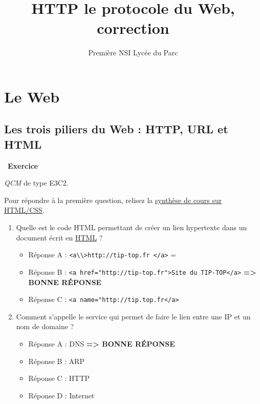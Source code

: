\documentclass[
  11pt,
]{article}
\title{HTTP le protocole du Web, correction}
\author{Première NSI Lycée du Parc}
\date{}
\newcommand{\passthrough}[1]{#1}
\providecommand{\tightlist}{%
  \setlength{\itemsep}{0pt}\setlength{\parskip}{0pt}}
\newcounter{exo}
\newenvironment{exercice}[1]
{\par \medskip   \addtocounter{exo}{1} \noindent  
\begin{bclogo}[arrondi =0.1,   noborder = true, logo=\bccrayon, marge=4]{~\textbf{Exercice} \textbf{\theexo} {\itshape #1} }  \par}
{
\end{bclogo}
 \par \bigskip }
\newcounter{def}
\newcounter{cours}
\begin{document}
\maketitle

\renewcommand*\contentsname{Table des matières}
{
\hypersetup{linkcolor=}
\setcounter{tocdepth}{3}
\tableofcontents
}
\hypertarget{le-web}{%
\section{Le Web}\label{le-web}}

\hypertarget{les-trois-piliers-du-web-http-url-et-html}{%
\subsection{Les trois piliers du Web : HTTP, URL et
HTML}\label{les-trois-piliers-du-web-http-url-et-html}}

\begin{exercice}{}

\emph{QCM} de type E3C2.

Pour répondre à la première question, relisez la
\href{https://parc-nsi.github.io/premiere-nsi/chapitre2/memo/MemoHTML-CSS-2020.pdf}{synthèse
de cours sur HTML/CSS}.

\begin{enumerate}
\def\labelenumi{\arabic{enumi}.}
\tightlist
\item
  Quelle est le code HTML permettant de créer un lien hypertexte dans un
  document écrit en
  \href{https://developer.mozilla.org/fr/docs/Glossaire/HTML}{HTML} ?

  \begin{itemize}
  \tightlist
  \item
    Réponse A : \passthrough{\lstinline!<a\\>http://tip-top.fr </a>!} =
  \item
    Réponse B :
    \passthrough{\lstinline!<a href="http://tip-top.fr">Site du TIP-TOP</a>!}
    \textbf{=\textgreater{} BONNE RÉPONSE}
  \item
    Réponse C : \passthrough{\lstinline!<a name="http://tip.top.fr</a>!}
  \end{itemize}
\item
  Comment s'appelle le service qui permet de faire le lien entre une IP
  et un nom de domaine ?

  \begin{itemize}
  \tightlist
  \item
    Réponse A : DNS \textbf{=\textgreater{} BONNE RÉPONSE}
  \item
    Réponse B : ARP
  \item
    Réponse C : HTTP
  \item
    Réponse D : Internet
  \end{itemize}
\end{enumerate}

\end{exercice}
\end{document}
